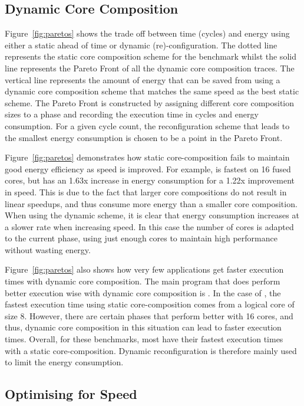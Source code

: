 \subsection{Dynamic Core Composition}
Figure~\ref{fig:paretos} shows the trade off between time (cycles) and energy using either a static ahead of time or dynamic (re)-configuration.
The dotted line represents the static core composition scheme for the benchmark whilst the solid line represents the Pareto Front of all the dynamic core composition traces.
The vertical line represents the amount of energy that can be saved from using a dynamic core composition scheme that matches the same speed as the best static scheme.
The Pareto Front is constructed by assigning different core composition sizes to a phase and recording the execution time in cycles and energy consumption.
For a given cycle count, the reconfiguration scheme that leads to the smallest energy consumption is chosen to be a point in the Pareto Front.

Figure~\ref{fig:paretos} demonstrates how static core-composition fails to maintain good energy efficiency as speed is improved.
For example,  is fastest on 16 fused cores, but has an 1.63x increase in energy consumption for a 1.22x improvement in speed.
This is due to the fact that larger core compositions do not result in linear speedups, and thus consume more energy than a smaller core composition.
When using the dynamic scheme, it is clear that energy consumption increases at a slower rate when increasing speed.
In this case the number of cores is adapted to the current phase, using just enough cores to maintain high performance without wasting energy.

Figure~\ref{fig:paretos} also shows how very few applications get faster execution times with dynamic core composition.
The main program that does perform better execution wise with dynamic core composition is .
In the case of , the fastest execution time using static core-composition comes from a logical core of size 8.
However, there are certain phases that perform better with 16 cores, and thus, dynamic core composition in this situation can lead to faster execution times.
Overall, for these benchmarks, most have their fastest execution times with a static core-composition.
Dynamic reconfiguration is therefore mainly used to limit the energy consumption.

\subsection{Optimising for Speed} \label{sec:dyn:speed}

